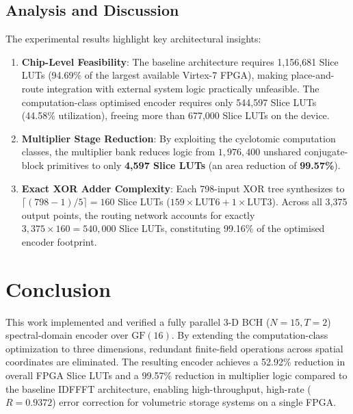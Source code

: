 \documentclass[journal]{IEEEtran}
\begin{document}
\subsection{Analysis and Discussion}
The experimental results highlight key architectural insights:
\begin{enumerate}
    \item \textbf{Chip-Level Feasibility}: The baseline architecture requires 1,156,681 Slice LUTs (94.69\% of the largest available Virtex-7 FPGA), making place-and-route integration with external system logic practically unfeasible. The computation-class optimised encoder requires only 544,597 Slice LUTs (44.58\% utilization), freeing more than 677,000 Slice LUTs on the device.
    \item \textbf{Multiplier Stage Reduction}: By exploiting the cyclotomic computation classes, the multiplier bank reduces logic from $1,976,400$ unshared conjugate-block primitives to only \textbf{4,597 Slice LUTs} (an area reduction of \textbf{99.57\%}).
    \item \textbf{Exact XOR Adder Complexity}: Each 798-input XOR tree synthesizes to $\lceil (798-1)/5 \rceil = 160$ Slice LUTs ($159 \times \text{LUT6} + 1 \times \text{LUT3}$). Across all 3,375 output points, the routing network accounts for exactly $3,375 \times 160 = 540,000$ Slice LUTs, constituting 99.16\% of the optimised encoder footprint.
\end{enumerate}

\section{Conclusion}
This work implemented and verified a fully parallel 3-D BCH ($N=15, T=2$) spectral-domain encoder over $\text{GF}(16)$. By extending the computation-class optimization to three dimensions, redundant finite-field operations across spatial coordinates are eliminated. The resulting encoder achieves a 52.92\% reduction in overall FPGA Slice LUTs and a 99.57\% reduction in multiplier logic compared to the baseline IDFFFT architecture, enabling high-throughput, high-rate ($R=0.9372$) error correction for volumetric storage systems on a single FPGA.
\end{document}
